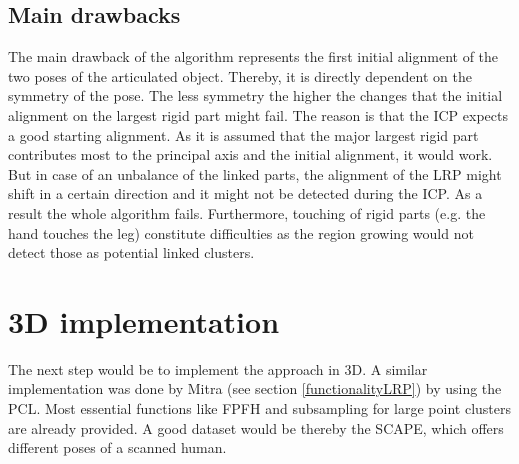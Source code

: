 \subsection{Main drawbacks}
The main drawback of the algorithm represents the first initial alignment of the two poses of the articulated object. Thereby, it is directly dependent on the symmetry of the pose. The less symmetry the higher the changes that the initial alignment on the largest rigid part might fail. The reason is that the ICP expects a good starting alignment. As it is assumed that the major largest rigid part contributes most to the principal axis and the initial alignment, it would work. But in case of an unbalance of the linked parts, the alignment of the LRP might shift in a certain direction and it might not be detected during the ICP. As a result the whole algorithm fails. Furthermore, touching of rigid parts (e.g. the hand touches the leg) constitute difficulties as the region growing would not detect those as potential linked clusters. 

\section{3D implementation}

The next step would be to implement the approach in 3D. A similar implementation was done by Mitra \cite{Mitra07} (see section \ref{functionalityLRP}) by using the PCL. Most essential functions like FPFH and subsampling for large point clusters are already provided. A good dataset would be thereby the SCAPE, which offers different poses of a scanned human. 








